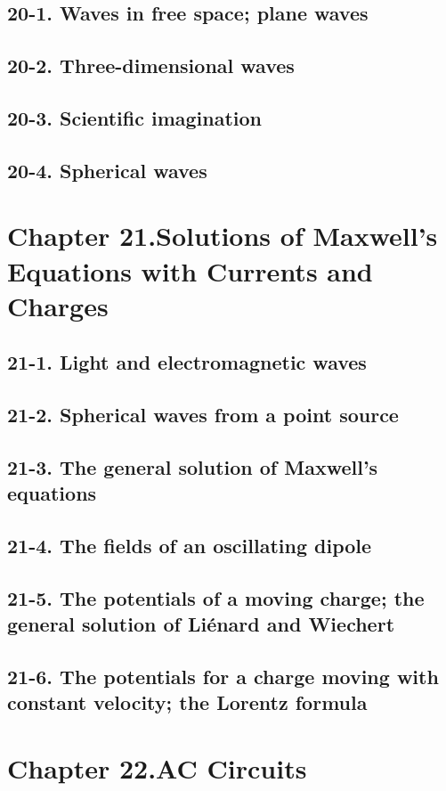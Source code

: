 \documentclass{article}
\begin{document}
\subsection{20-1. Waves in free space; plane waves}
\subsection{20-2. Three-dimensional waves}
\subsection{20-3. Scientific imagination}
\subsection{20-4. Spherical waves}
\section{Chapter 21.Solutions of Maxwell’s Equations with Currents and Charges}
\subsection{21-1. Light and electromagnetic waves}
\subsection{21-2. Spherical waves from a point source}
\subsection{21-3. The general solution of Maxwell’s equations}
\subsection{21-4. The fields of an oscillating dipole}
\subsection{21-5. The potentials of a moving charge; the general solution of Liénard and Wiechert}
\subsection{21-6. The potentials for a charge moving with constant velocity; the Lorentz formula}
\section{Chapter 22.AC Circuits}
\end{document}
